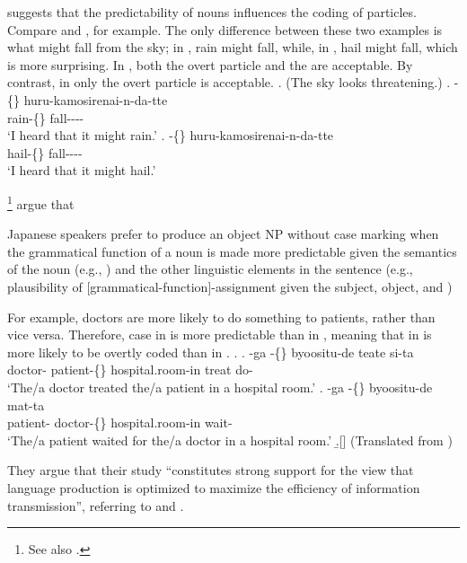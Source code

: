  suggests that
the predictability of nouns influences the coding of particles.
Compare \Next[a] and \Next[b], for example.
The only difference between these two examples is what
might fall from the sky;
in \Next[a], rain might fall,
while, in \Next[b], hail might fall,
which is more surprising.
In \Next[a], both the overt particle  and the 
are acceptable.
By contrast, in \Next[b] only the overt particle is acceptable.
%
\ex. (The sky looks threatening.)
 \ag. -\{\} huru-kamosirenai-n-da-tte \\
      rain-\{\} fall---- \\
      `I heard that it might rain.'
 \bg. -\{\} huru-kamosirenai-n-da-tte \\
      hail-\{\} fall---- \\
      `I heard that it might hail.'
      \hfill{\cite[290]{niwa06}}

\footnote{See also \cite[p.~863][]{kurumadajaeger15}.} argue that
\begin{modquote}
Japanese speakers prefer to produce an object NP without case marking
when the grammatical function of a noun is made more predictable
given the semantics of the noun (e.g., ) and
the other linguistic elements in the sentence
(e.g., plausibility of [grammatical-function]-assignment given the subject, object, and )
\end{modquote}
For example,
doctors are more likely to do something to patients,
rather than vice versa.
Therefore, case in \Next[a] is more predictable than in \Next[b],
meaning that  in \Next[b] is more likely to be overtly coded than
 in \Next[a].
%
\ex.
 \ag. -ga -\{\} byoositu-de teate si-ta \\
      doctor- patient-\{\} hospital.room-in treat do- \\
      `The/a doctor treated the/a patient in a hospital room.'
 \bg. -ga -\{\} byoositu-de mat-ta \\
      patient- doctor-\{\} hospital.room-in wait- \\
      `The/a patient waited for the/a doctor in a hospital room.'
  \b.[]    \hfill{(Translated from )}

They argue that their study
``constitutes strong support for the view that
language production is optimized to maximize the efficiency of information transmission'',
referring to  and .

